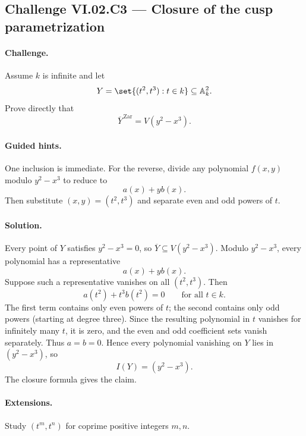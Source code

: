 \subsection*{Challenge VI.02.C3 --- Closure of the cusp parametrization}
\label{chal:vi02-c3}

\paragraph{Challenge.}
Assume \(k\) is infinite and let
\[
Y=\set{(t^2,t^3):t\in k}\subseteq\mathbb A_k^2.
\]
Prove directly that
\[
\overline Y^{\,\mathrm{Zar}}=V(y^2-x^3).
\]

\ifdefined\FullProblemDossiers
\paragraph{Guided hints.}
One inclusion is immediate.  For the reverse, divide any polynomial \(f(x,y)\) modulo
\(y^2-x^3\) to reduce to
\[
a(x)+y b(x).
\]
Then substitute \((x,y)=(t^2,t^3)\) and separate even and odd powers of \(t\).

\paragraph{Solution.}
Every point of \(Y\) satisfies \(y^2-x^3=0\), so \(\overline Y\subseteq V(y^2-x^3)\).
Modulo \(y^2-x^3\), every polynomial has a representative
\[
a(x)+yb(x).
\]
Suppose such a representative vanishes on all \((t^2,t^3)\).  Then
\[
a(t^2)+t^3b(t^2)=0\qquad\text{for all }t\in k.
\]
The first term contains only even powers of \(t\); the second contains only odd powers
(starting at degree three).  Since the resulting polynomial in \(t\) vanishes for infinitely
many \(t\), it is zero, and the even and odd coefficient sets vanish separately.  Thus
\(a=b=0\).  Hence every polynomial vanishing on \(Y\) lies in \((y^2-x^3)\), so
\[
I(Y)=(y^2-x^3).
\]
The closure formula gives the claim.

\paragraph{Extensions.}
Study \((t^m,t^n)\) for coprime positive integers \(m,n\).
\fi
